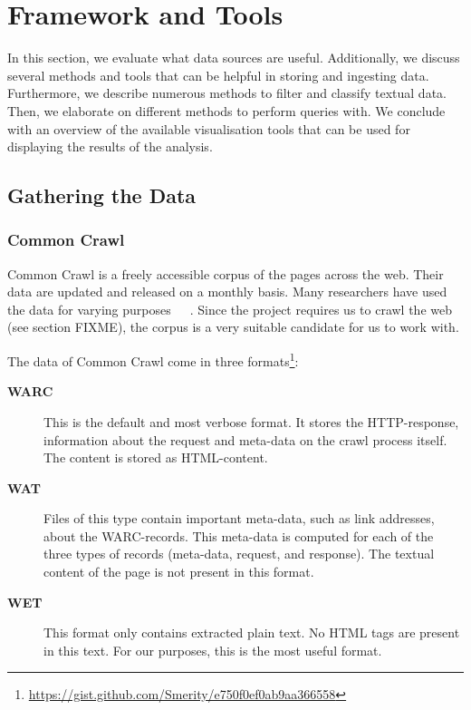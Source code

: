 \section{Framework and Tools}
In this section, we evaluate what data sources are useful. Additionally, we discuss several methods and tools that can be helpful in storing and ingesting data. Furthermore, we describe numerous methods to filter and classify textual data. Then, we elaborate on different methods to perform queries with. We conclude with an overview of the available visualisation tools that can be used for displaying the results of the analysis.

\subsection{Gathering the Data}

\subsubsection{Common Crawl} \label{sec:commoncrawl}
Common Crawl \cite{commoncrawl} is a freely accessible corpus of the pages across the web. Their data are updated and released on a monthly basis. Many researchers have used the data for varying purposes~\cite{smith2013dirt}~\cite{muhleisen2012web}~\cite{singh2012wikilinks}. Since the project requires us to crawl the web (see section {\color{red} FIXME}), the corpus is a very suitable candidate for us to work with.

The data of Common Crawl come in three formats\footnote{\url{https://gist.github.com/Smerity/e750f0ef0ab9aa366558}}: 
\begin{description}
\item[\textbf{WARC}] This is the default and most verbose format. It stores the HTTP-response, information about the request and meta-data on the crawl process itself. The content is stored as HTML-content.
\item[\textbf{WAT}] Files of this type contain important meta-data, such as link addresses, about the WARC-records. This meta-data is computed for each of the three types of records (meta-data, request, and response). The textual content of the page is not present in this format.
\item[\textbf{WET}] This format only contains extracted plain text. No HTML tags are present in this text. For our purposes, this is the most useful format.
\end{description}

